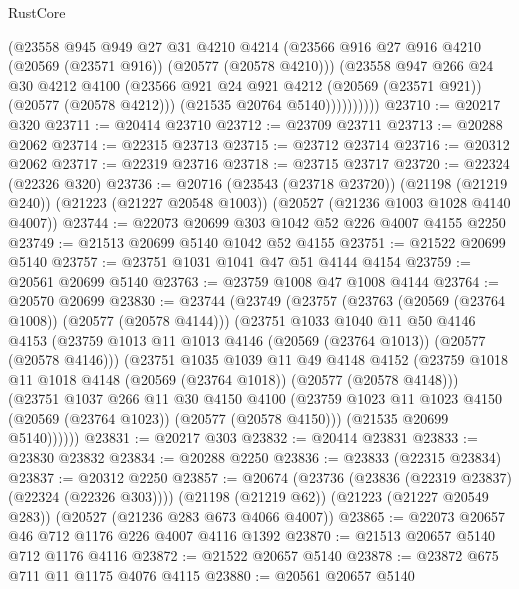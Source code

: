 \begin{lexlean}{RustCore}
\begin{coremodule}
                  (@23558
                    @945
                    @949
                    @27
                    @31
                    @4210
                    @4214
                    (@23566 @916 @27 @916 @4210 (@20569 (@23571 @916)) (@20577 (@20578 @4210)))
                    (@23558
                      @947
                      @266
                      @24
                      @30
                      @4212
                      @4100
                      (@23566 @921 @24 @921 @4212 (@20569 (@23571 @921)) (@20577 (@20578 @4212)))
                      (@21535 @20764 @5140))))))))))
@23710 := @20217 @320
@23711 := @20414 @23710
@23712 := @23709 @23711
@23713 := @20288 @2062
@23714 := @22315 @23713
@23715 := @23712 @23714
@23716 := @20312 @2062
@23717 := @22319 @23716
@23718 := @23715 @23717
@23720 := @22324 (@22326 @320)
@23736 := @20716
    (@23543 (@23718 @23720))
    (@21198 (@21219 @240))
    (@21223 (@21227 @20548 @1003))
    (@20527 (@21236 @1003 @1028 @4140 @4007))
@23744 := @22073 @20699 @303 @1042 @52 @226 @4007 @4155 @2250
@23749 := @21513 @20699 @5140 @1042 @52 @4155
@23751 := @21522 @20699 @5140
@23757 := @23751 @1031 @1041 @47 @51 @4144 @4154
@23759 := @20561 @20699 @5140
@23763 := @23759 @1008 @47 @1008 @4144
@23764 := @20570 @20699
@23830 := @23744
    (@23749
      (@23757
        (@23763 (@20569 (@23764 @1008)) (@20577 (@20578 @4144)))
        (@23751
          @1033
          @1040
          @11
          @50
          @4146
          @4153
          (@23759 @1013 @11 @1013 @4146 (@20569 (@23764 @1013)) (@20577 (@20578 @4146)))
          (@23751
            @1035
            @1039
            @11
            @49
            @4148
            @4152
            (@23759 @1018 @11 @1018 @4148 (@20569 (@23764 @1018)) (@20577 (@20578 @4148)))
            (@23751
              @1037
              @266
              @11
              @30
              @4150
              @4100
              (@23759 @1023 @11 @1023 @4150 (@20569 (@23764 @1023)) (@20577 (@20578 @4150)))
              (@21535 @20699 @5140))))))
@23831 := @20217 @303
@23832 := @20414 @23831
@23833 := @23830 @23832
@23834 := @20288 @2250
@23836 := @23833 (@22315 @23834)
@23837 := @20312 @2250
@23857 := @20674
    (@23736 (@23836 (@22319 @23837) (@22324 (@22326 @303))))
    (@21198 (@21219 @62))
    (@21223 (@21227 @20549 @283))
    (@20527 (@21236 @283 @673 @4066 @4007))
@23865 := @22073 @20657 @46 @712 @1176 @226 @4007 @4116 @1392
@23870 := @21513 @20657 @5140 @712 @1176 @4116
@23872 := @21522 @20657 @5140
@23878 := @23872 @675 @711 @11 @1175 @4076 @4115
@23880 := @20561 @20657 @5140

\end{coremodule}
\end{lexlean}
